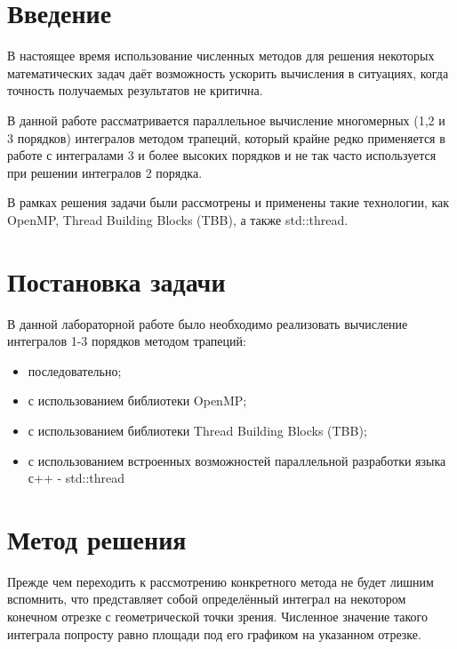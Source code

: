 \documentclass{report}
\begin{document}
	\tableofcontents
	\newpage

\section*{Введение}
\par В настоящее время использование численных методов для решения некоторых математических задач даёт возможность ускорить вычисления в ситуациях, когда точность получаемых результатов не критична.
    
\par В данной работе рассматривается параллельное вычисление многомерных (1,2 и 3 порядков) интегралов методом трапеций, который крайне редко применяется в работе с интегралами 3 и более высоких порядков и не так часто используется при решении интегралов 2 порядка.
 
\par В рамках решения задачи были рассмотрены и применены такие технологии, как OpenMP, Thread Building Blocks (TBB), а также std::thread.
\newpage

\section*{Постановка задачи}
В данной лабораторной работе было необходимо реализовать вычисление интегралов 1-3 порядков методом трапеций:
\begin{itemize}
\item последовательно;
\item с использованием библиотеки OpenMP;
\item с использованием библиотеки Thread Building Blocks (TBB);
\item с использованием встроенных возможностей параллельной разработки языка с++ - std::thread
\end{itemize}
\newpage

\section*{Метод решения}
\par Прежде чем переходить к рассмотрению конкретного метода не будет лишним вспомнить, что представляет собой определённый интеграл на некотором конечном отрезке с геометрической точки зрения. Численное значение такого интеграла попросту равно площади под его графиком на указанном отрезке. 
\end{document}
